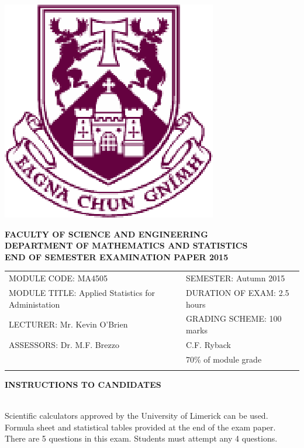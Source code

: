 \documentclass[a4paper,12pt]{article}
\begin{document}
\begin{center}
       \includegraphics[scale=0.55]{shieldtransparent2}
\end{center}

\begin{center}
\vspace{1cm}
\large \bf {FACULTY OF SCIENCE AND ENGINEERING} \\[0.5cm]
\normalsize DEPARTMENT OF MATHEMATICS AND STATISTICS \\[1.25cm]
\large \bf {END OF SEMESTER EXAMINATION PAPER 2015} \\[1.5cm]
\end{center}

\begin{tabular}{ll}
MODULE CODE: MA4505 & SEMESTER: Autumn 2015 \\[1cm]
MODULE TITLE: Applied Statistics for Administation & DURATION OF EXAM: 2.5 hours \\[1cm]
LECTURER: Mr. Kevin O'Brien & GRADING SCHEME: 100 marks \\[1cm]
ASSESSORS: Dr. M.F. Brezzo & C.F. Ryback \\[1cm]
& \phantom{GRADING SCHEME:} \footnotesize {70\% of module grade} \\[0.8cm]
\\[1cm]
\end{tabular}
\begin{center}
{\bf INSTRUCTIONS TO CANDIDATES}
\end{center}

{\noindent \\ Scientific calculators approved by the University of Limerick can be used. \\
Formula sheet and statistical tables provided at the end of the exam paper.\\
There are 5 questions in this exam. Students must attempt any 4 questions.}
\newpage
\end{document}
